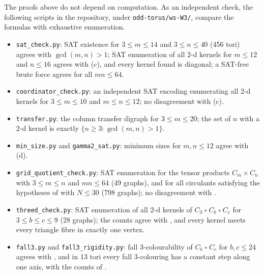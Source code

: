 \documentclass[11pt]{article}
\theoremstyle{plain}
\theoremstyle{definition}
\theoremstyle{remark}
\newcommand{\T}{\mathbin{\square}}
\begin{document}
The proofs above do not depend on computation. As an independent check, the following
scripts in the repository, under \texttt{odd-torus/ws-W3/}, compare the formulas with exhaustive
enumeration.
\begin{itemize}
  \item \texttt{sat\_check.py}: SAT existence for $3 \le m \le 14$ and $3 \le n \le 40$
        (456 tori) agrees with $\gcd(m,n) > 1$; SAT enumeration of all $2$-d kernels for
        $m \le 12$ and $n \le 16$ agrees with (c), and every kernel found is
        diagonal; a SAT-free brute force agrees for all $mn \le 64$.
  \item \texttt{coordinator\_check.py}: an independent SAT encoding enumerating all $2$-d
        kernels for $3 \le m \le 10$ and $m \le n \le 12$; no disagreement with
        (c).
  \item \texttt{transfer.py}: the column transfer digraph for $3 \le m \le 20$; the set of
        $n$ with a $2$-d kernel is exactly $\{n \ge 3 : \gcd(m,n) > 1\}$.
  \item \texttt{min\_size.py} and \texttt{gamma2\_sat.py}: minimum sizes for $m, n \le 12$
        agree with (d).
  \item \texttt{grid\_quotient\_check.py}: SAT enumeration for the tensor products
        $C_m \times C_n$ with $3 \le m \le n$ and $mn \le 64$ (49 graphs), and for all
        circulants satisfying the hypotheses of  with $N \le 30$
        (798 graphs); no disagreement with .
  \item \texttt{threed\_check.py}: SAT enumeration of all $2$-d kernels of
        $C_3 \T C_b \T C_c$ for $3 \le b \le c \le 9$ (28 graphs); the counts agree with
        , and every kernel meets every triangle fibre in exactly one vertex.
  \item \texttt{fall3.py} and \texttt{fall3\_rigidity.py}: fall $3$-colourability of
        $C_b \T C_c$ for $b, c \le 24$ agrees with , and in 13
        tori every fall $3$-colouring has a constant step along one axis, with the counts of
        .
\end{itemize}
\end{document}
